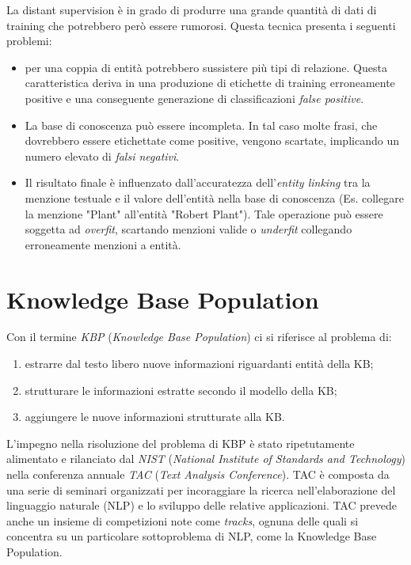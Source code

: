 La distant supervision è in grado di produrre una grande quantità di dati di training che potrebbero però essere rumorosi. Questa tecnica presenta i seguenti problemi:
\begin{itemize}
\item per una coppia di entità potrebbero sussistere più tipi di relazione. Questa caratteristica deriva in una produzione di etichette di training erroneamente positive e una conseguente generazione di classificazioni \textit{false positive}.
\item La base di conoscenza può essere incompleta. In tal caso molte frasi, che dovrebbero essere etichettate come positive, vengono scartate, implicando un numero elevato di \textit{falsi negativi}.
\item Il risultato finale è influenzato dall'accuratezza dell'\textit{entity linking} tra la menzione testuale e il valore dell'entità nella base di conoscenza (Es. collegare la menzione "Plant" all'entità "Robert Plant"). Tale operazione può essere soggetta ad \textit{overfit}, scartando menzioni valide o \textit{underfit} collegando erroneamente menzioni a entità. 
\end{itemize}




\section{Knowledge Base Population}
\label{sec:literature_review:kbp}

Con il termine \textit{KBP} (\textit{Knowledge Base Population}) ci si riferisce al problema di:
\begin{enumerate}
\item estrarre dal testo libero nuove informazioni riguardanti entità della KB;
\item strutturare le informazioni estratte secondo il modello della KB;
\item aggiungere le nuove informazioni strutturate alla KB.
\end{enumerate}

L'impegno nella risoluzione del problema di KBP è stato ripetutamente alimentato e rilanciato dal \textit{NIST} (\textit{National Institute of Standards and Technology}) nella conferenza annuale \textit{TAC} (\textit{Text Analysis Conference}). TAC è composta
da una serie di seminari organizzati per incoraggiare la ricerca nell'elaborazione del linguaggio naturale (NLP) e lo sviluppo delle relative applicazioni\cite{TAC}. TAC prevede anche un insieme di competizioni note come \textit{tracks}, ognuna delle quali si concentra su un particolare sottoproblema di NLP, come la Knowledge Base Population.

